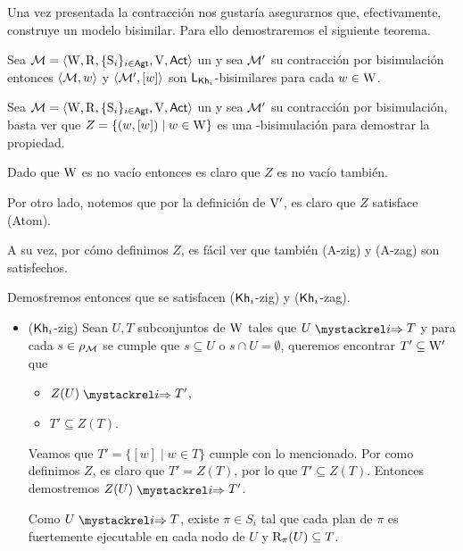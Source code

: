 Una vez presentada la contracción nos gustaría asegurarnos que, efectivamente, construye un modelo bisimilar. Para ello demostraremos el 
siguiente teorema.

\begin{teorema}
    Sea $\mathcal{M}=\langle \mathrm{W},\mathrm{R},\{ \mathrm{S}_i \}_{i \in {\rm \sf Agt}},\mathrm{V},{\rm \sf Act} \rangle$ un \ults y sea $\mathcal{M}'$ su contracción por bisimulación entonces 
    $\langle \mathcal{M},w \rangle$ y $\langle \mathcal{M}',[w] \rangle$ son $\mathsf{L}_{\mathsf{Kh}_i}$-bisimilares para cada $w \in \mathrm{W}$.
\end{teorema}

\begin{demostracion}
    Sea $\mathcal{M}=\langle \mathrm{W},\mathrm{R},\{ \mathrm{S}_i \}_{i \in {\rm \sf Agt}},\mathrm{V},{\rm \sf Act} \rangle$ un \ults
    y sea $\mathcal{M}'$ su contracción por bisimulación, basta ver que $Z = \{(w,[w]) \mid w \in\mathrm{W}\}$ es una \KHilogic-bisimulación para demostrar la propiedad.

    Dado que $\mathrm{W}$ es no vacío entonces es claro que $Z$ es no vacío también.

    Por otro lado, notemos que por la definición de $\mathrm{V}'$, es claro que $Z$ satisface (Atom).

    A su vez, por cómo definimos $Z$, es fácil ver que también (A-zig) y (A-zag) son satisfechos.
    
    Demostremos entonces que se satisfacen ($\mathsf{Kh}_i$-zig) y ($\mathsf{Kh}_i$-zag).

    \begin{itemize}
        \item ($\mathsf{Kh}_i$-zig) Sean $U, T$ subconjuntos de $\mathrm{W}$ tales que $U \ultsExecAgi T$ y para cada $s \in \rho_{\mathcal{M}}$ se cumple que 
        $s \subseteq U$ o $s \cap U = \emptyset$, queremos encontrar $T' \subseteq \mathrm{W}'$ que

        \begin{multicols}{2}
            \begin{itemize}
                \item $Z(U) \ultsExecAgi T'$, 
                \item $T' \subseteq Z(T)$.
            \end{itemize}
        \end{multicols}

        Veamos que $T' = \{ [w] \mid w \in T\}$ cumple con lo mencionado. Por como definimos $Z$, es claro que $T'  = Z(T)$, por lo que 
        $T' \subseteq Z(T)$. Entonces demostremos $Z(U) \ultsExecAgi T'$.

        Como $U \ultsExecAgi T$, existe $\pi \in S_i$ tal que cada plan de $\pi$ es fuertemente ejecutable en cada nodo de $U$ y 
        $\mathrm{R}_\pi(U) \subseteq T$. 


\end{itemize}
\end{demostracion}
